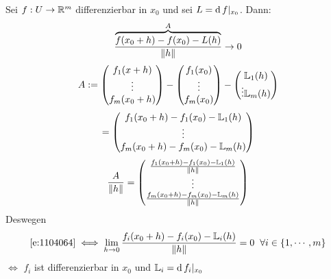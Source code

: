 \begin{Bem}
  Sei $f:U\rightarrow\mathbb{R}^m$ differenzierbar in $x_0$ und sei $L=\operatorname{d} f|_{x_0}$. Dann:
  \begin{equation}
    \label{e:1104064}
    \frac{\overbrace{f(x_0+h)-f(x_0)-L(h)}^A}{\left\| h \right\|}\rightarrow 0
  \end{equation}
  \[A:= \begin{pmatrix}
    f_1(x+h)\\ \vdots \\ f_m(x_0+h)
  \end{pmatrix} - \begin{pmatrix}
    f_1(x_0)\\ \vdots \\ f_m(x_0)
  \end{pmatrix} - \begin{pmatrix}
    \mathbb{L}_1(h) \\ \vdots \mathbb{L}_m(h)
  \end{pmatrix}\]
  \[ = \begin{pmatrix}
    f_1(x_0+h)-f_1(x_0)-\mathbb{L}_1(h)\\
    \vdots \\
    f_m(x_0+h)-f_m(x_0)-\mathbb{L}_m(h)\\
  \end{pmatrix} \]
  \[\frac{A}{\left\| h \right\|}= \begin{pmatrix}
    \frac{f_1(x_0+h)-f_1(x_0)-\mathbb{L}_1(h)}{\left\| h \right\|} \\
    \vdots \\
    \frac{f_m(x_0+h)-f_m(x_0)-\mathbb{L}_m(h)}{\left\| h \right\|} \\
  \end{pmatrix}\]
  Deswegen
  \[\ref{e:1104064} \iff \displaystyle\lim_{h\rightarrow0}\frac{f_i(x_0+h)-f_i(x_0)-\mathbb{L}_i(h)}{\left\| h \right\|} = 0\hspace{2mm}\forall i\in \left\{ 1,\cdots,m \right\}\]
  $\iff$ $f_i$ ist differenzierbar in $x_0$ und $\mathbb{L}_i=\operatorname{d} f_i|_{x_0}$
\end{Bem}

